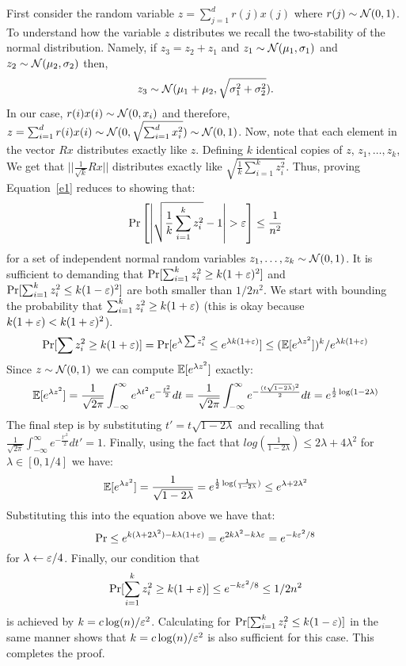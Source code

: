 First consider the random variable $z = \sum_{j=1}^{d}r(j)x(j)$ where $r(j) \sim {\mathcal{N}}(0,1)$. 
To understand how the variable $z$ distributes we recall the two-stability of the
normal distribution. Namely, if $z_3 = z_2 + z_1$ and 
$z_1 \sim {\mathcal{N}}(\mu_1,\sigma_{1})$ and $z_2 \sim {\mathcal{N}}(\mu_2,\sigma_{2})$ then, $$z_3 \sim {\mathcal{N}}(\mu_1 + \mu_2,\sqrt{\sigma^{2}_{1} + \sigma^{2}_{2}}).$$
In our case,  $r(i)x(i) \sim {\mathcal{N}}(0,x_{i})$ and therefore, $z = \sum_{i=1}^{d}r(i)x(i) \sim {\mathcal{N}}(0,\sqrt{\sum_{i=1}^{d}x^{2}_{i}}) \sim {\mathcal{N}}(0,1)$.
%
Now, note that each element in the vector $Rx$ distributes exactly like $z$.
Defining $k$ identical copies of $z$, $z_1,\ldots,z_k$,
We get that $||\frac{1}{\sqrt{k}}Rx||$ distributes exactly like $\sqrt{\frac{1}{k}\sum_{i=1}^{k} z^{2}_{i}}$.
Thus, proving Equation~\ref{e1} reduces to showing that:
\begin{equation}
\Pr\left[ \left| \sqrt{\frac{1}{k}\sum_{i=1}^{k} z^{2}_{i}} - 1 \right| > \varepsilon \right] \le \frac{1}{n^2} 
\end{equation}
for a set of independent normal random variables $z_1,\ldots,z_k \sim {\mathcal{N}}(0,1)$.
It is sufficient to demanding that $\Pr[\sum_{i=1}^{k} z^{2}_{i} \ge k(1+\varepsilon)^2]$ and $\Pr[\sum_{i=1}^{k} z^{2}_{i} \le k(1-\varepsilon)^2]$ are both smaller than $1/2n^2$.
We start with bounding the probability that $\sum_{i=1}^{k} z^{2}_{i} \ge k(1+\varepsilon)$ (this is okay because $k(1+\varepsilon) < k(1+\varepsilon)^2$).
\[
\Pr[\sum z^{2}_{i} \ge k(1+\varepsilon)] = \Pr[e^{\lambda \sum z^{2}_{i}} \le e^{\lambda k (1+\varepsilon)}] \le ({\mathbb E}[e^{\lambda z^2}])^k/e^{\lambda k (1+\varepsilon)}
\]
Since $z \sim {\mathcal{N}}(0,1)$ we can compute ${\mathbb E}[e^{\lambda z^2}]$ exactly:
\[
{\mathbb E} [e^{\lambda z^{2}}] = \frac{1}{\sqrt{2\pi}}\int_{-\infty}^{\infty} e^{\lambda t^{2}} e^{-\frac{t^{2}}{2}} dt =\frac{1}{\sqrt{2\pi}}\int_{-\infty}^{\infty} e^{-\frac{(t\sqrt{1-2\lambda})^{2}}{2}}dt = e^{\frac{1}{2} \log(1-2\lambda)}
\]
The final step is by substituting $t' = t\sqrt{1-2\lambda}$ and recalling that $\frac{1}{\sqrt{2\pi}}\int_{-\infty}^{\infty} e^{-\frac{t'^{2}}{2}}dt' = 1$.
Finally, using the fact that $log(\frac{1}{1-2\lambda}) \le 2\lambda + 4\lambda^2$ for $\lambda \in [0,1/4]$ we have:
\[
{\mathbb E} [e^{\lambda z^{2}}] = \frac{1}{\sqrt{1-2\lambda}} = e^{\frac{1}{2} \log(\frac{1}{1-2\lambda})} \le e^{\lambda + 2\lambda^2}
\]
Substituting this into the equation above we have that:
\[
\Pr \le e^{k(\lambda  + 2\lambda^2) - k\lambda (1+\varepsilon)} = e^{ 2k\lambda^2 - k\lambda\varepsilon}  = e^{ - k\varepsilon^2/8}  
\]
for $\lambda \leftarrow \varepsilon/4$. Finally, our condition that 
\[
\Pr[\sum_{i=1}^{k} z^{2}_{i} \ge k(1+\varepsilon)] \le e^{ - k\varepsilon^2/8} \le 1/2n^2
\]
is achieved by $k = c\log(n)/\varepsilon^2$.
Calculating for $\Pr[\sum_{i=1}^{k} z^{2}_{i} \le k(1-\varepsilon)]$ in the same manner shows that $k = c\log(n)/\varepsilon^2$ is also sufficient for this case.
This completes the proof.




















